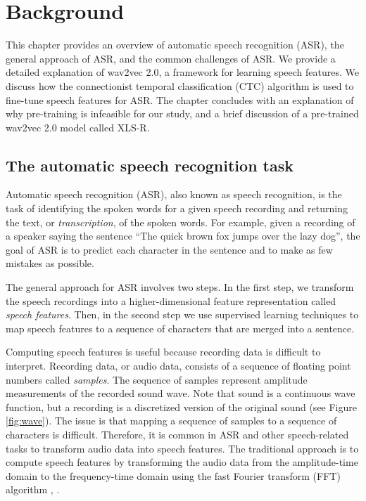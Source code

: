 \graphicspath{{background/fig/}}

\chapter{Background} \label{chap:background}
This chapter provides an overview of automatic speech recognition (ASR), the general approach of ASR, and the common challenges of ASR.
We provide a detailed explanation of wav2vec 2.0, a framework for learning speech features.
We discuss how the connectionist temporal classification (CTC) algorithm is used to fine-tune speech features for ASR.
The chapter concludes with an explanation of why pre-training is infeasible for our study,
and a brief discussion of a pre-trained wav2vec 2.0 model called XLS-R.

\section{The automatic speech recognition task}\label{sec:background}
Automatic speech recognition (ASR), also known as speech recognition, 
is the task of identifying the spoken words for a given speech recording and returning the text, or \emph{transcription}, of the spoken words.
For example, given a recording of a speaker saying the sentence ``The quick brown fox jumps over the lazy dog'',
the goal of ASR is to predict each character in the sentence and to make as few mistakes as possible.

The general approach for ASR involves two steps.
In the first step, we transform the speech recordings into a higher-dimensional feature representation called \emph{speech features}.
Then, in the second step we use supervised learning techniques to map speech features
to a sequence of characters that are merged into a sentence.

Computing speech features is useful because recording data is difficult to interpret. 
Recording data, or audio data, consists of a sequence of floating point numbers called \emph{samples}.
The sequence of samples represent amplitude measurements of the recorded sound wave. 
Note that sound is a continuous wave function, but a recording is a discretized version of the original sound (see Figure \ref{fig:wave}).
The issue is that mapping a sequence of samples to a sequence of characters is difficult.
Therefore, it is common in ASR and other speech-related tasks to transform audio data into speech features.
The traditional approach is to compute speech features by transforming the audio data from the amplitude-time domain 
to the frequency-time domain using the fast Fourier transform (FFT) algorithm \cite{cochran1967fast}, \cite{cooley1969fast}.

